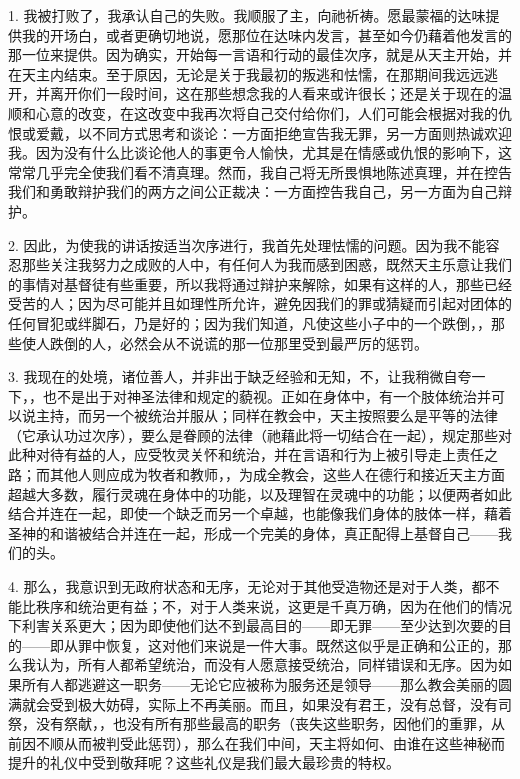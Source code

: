 \par

1. 我被打败了，我承认自己的失败。我顺服了主，向祂祈祷。愿最蒙福的达味提供我的开场白，或者更确切地说，愿那位在达味内发言，甚至如今仍藉着他发言的那一位来提供。因为确实，开始每一言语和行动的最佳次序，就是从天主开始，并在天主内结束。至于原因，无论是关于我最初的叛逃和怯懦，在那期间我远远逃开，并离开你们一段时间，这在那些想念我的人看来或许很长；还是关于现在的温顺和心意的改变，在这改变中我再次将自己交付给你们，人们可能会根据对我的仇恨或爱戴，以不同方式思考和谈论：一方面拒绝宣告我无罪，另一方面则热诚欢迎我。因为没有什么比谈论他人的事更令人愉快，尤其是在情感或仇恨的影响下，这常常几乎完全使我们看不清真理。然而，我自己将无所畏惧地陈述真理，并在控告我们和勇敢辩护我们的两方之间公正裁决：一方面控告我自己，另一方面为自己辩护。\par

2. 因此，为使我的讲话按适当次序进行，我首先处理怯懦的问题。因为我不能容忍那些关注我努力之成败的人中，有任何人为我而感到困惑，既然天主乐意让我们的事情对基督徒有些重要，所以我将通过辩护来解除，如果有这样的人，那些已经受苦的人；因为尽可能并且如理性所允许，避免因我们的罪或猜疑而引起对团体的任何冒犯或绊脚石，乃是好的；因为我们知道，凡使这些小子中的一个跌倒，，那些使人跌倒的人，必然会从不说谎的那一位那里受到最严厉的惩罚。\par

3. 我现在的处境，诸位善人，并非出于缺乏经验和无知，不，让我稍微自夸一下，，也不是出于对神圣法律和规定的藐视。正如在身体中，有一个肢体统治并可以说主持，而另一个被统治并服从；同样在教会中，天主按照要么是平等的法律（它承认功过次序），要么是眷顾的法律（祂藉此将一切结合在一起），规定那些对此种对待有益的人，应受牧灵关怀和统治，并在言语和行为上被引导走上责任之路；而其他人则应成为牧者和教师，，为成全教会，这些人在德行和接近天主方面超越大多数，履行灵魂在身体中的功能，以及理智在灵魂中的功能；以便两者如此结合并连在一起，即使一个缺乏而另一个卓越，也能像我们身体的肢体一样，藉着圣神的和谐被结合并连在一起，形成一个完美的身体，真正配得上基督自己——我们的头。\par

4. 那么，我意识到无政府状态和无序，无论对于其他受造物还是对于人类，都不能比秩序和统治更有益；不，对于人类来说，这更是千真万确，因为在他们的情况下利害关系更大；因为即使他们达不到最高目的——即无罪——至少达到次要的目的——即从罪中恢复，这对他们来说是一件大事。既然这似乎是正确和公正的，那么我认为，所有人都希望统治，而没有人愿意接受统治，同样错误和无序。因为如果所有人都逃避这一职务——无论它应被称为服务还是领导——那么教会美丽的圆满就会受到极大妨碍，实际上不再美丽。而且，如果没有君王，没有总督，没有司祭，没有祭献，，也没有所有那些最高的职务（丧失这些职务，因他们的重罪，从前因不顺从而被判受此惩罚），那么在我们中间，天主将如何、由谁在这些神秘而提升的礼仪中受到敬拜呢？这些礼仪是我们最大最珍贵的特权。\par

